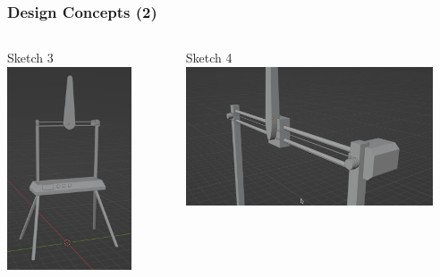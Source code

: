 \documentclass[aspectratio=169]{beamer}
\begin{document}
\begin{frame}
    \frametitle{Design Concepts (2)}

    \begin{columns}
        \begin{column}{0.48\textwidth}
            \begin{block}{Sketch 3}
                \includegraphics[height=6cm]{Full}
            \end{block}
        \end{column}

        \begin{column}{0.48\textwidth}
            \begin{block}{Sketch 4}
                \includegraphics[width=7.3cm]{UpperAssy}
            \end{block}
        \end{column}
    \end{columns}


\end{frame}
\end{document}
